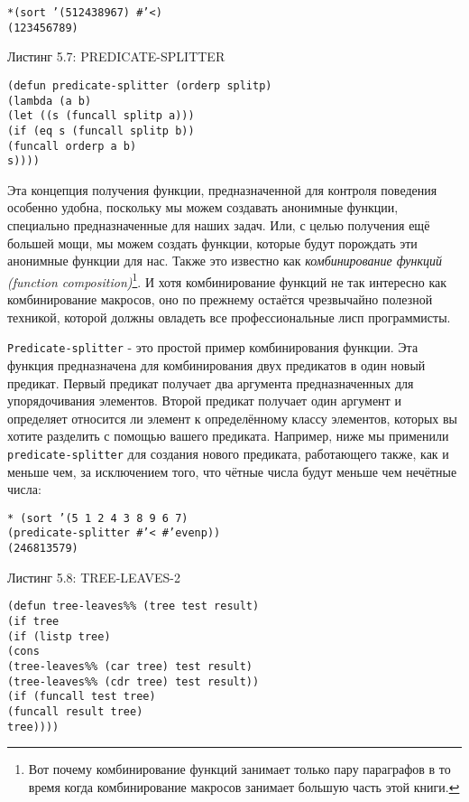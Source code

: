 \begin{verbatim}
*(sort ’(512438967) #’<)
(123456789)
\end{verbatim}

Листинг 5.7: PREDICATE-SPLITTER\label{listing_5.7}
\listbegin
\begin{verbatim}
(defun predicate-splitter (orderp splitp)
(lambda (a b)
(let ((s (funcall splitp a)))
(if (eq s (funcall splitp b))
(funcall orderp a b)
s))))
\end{verbatim}
\listend

Эта концепция получения функции, предназначенной для контроля поведения особенно удобна, поскольку мы можем создавать анонимные функции, специально предназначенные для наших задач. Или, с целью получения ещё большей мощи, мы можем создать функции, которые будут порождать эти анонимные функции для нас. Также это известно как \emph{комбинирование функций (function composition)}\footnote{Вот почему комбинирование функций занимает только пару параграфов в то время когда комбинирование макросов занимает большую часть этой книги.}. И хотя комбинирование функций не так интересно как комбинирование макросов, оно по прежнему остаётся чрезвычайно полезной техникой, которой должны овладеть все профессиональные лисп программисты.



\verb"Predicate-splitter" - это простой пример комбинирования функции. Эта функция предназначена для комбинирования двух предикатов в один новый предикат. Первый предикат получает два аргумента предназначенных для упорядочивания элементов. Второй предикат получает один аргумент и определяет относится ли элемент к определённому классу элементов, которых вы хотите разделить с помощью вашего предиката. Например, ниже мы применили \verb"predicate-splitter" для создания нового предиката, работающего также, как и меньше чем, за исключением того, что чётные числа будут меньше чем нечётные числа:

\begin{verbatim}
* (sort ’(5 1 2 4 3 8 9 6 7)
(predicate-splitter #’< #’evenp))
(246813579)
\end{verbatim}

Листинг 5.8: TREE-LEAVES-2\label{listing_5.8}
\listbegin
\begin{verbatim}
(defun tree-leaves%% (tree test result)
(if tree
(if (listp tree)
(cons
(tree-leaves%% (car tree) test result)
(tree-leaves%% (cdr tree) test result))
(if (funcall test tree)
(funcall result tree)
tree))))
\end{verbatim}
\listend

